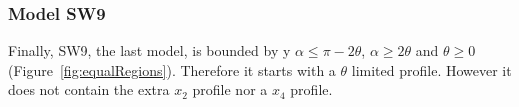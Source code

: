 \subsubsection{Model SW9} \label{SW9}

Finally, SW9, the last model, is bounded by y $\alpha \le \pi - 2\theta$, $\alpha \ge 2\theta$ and $\theta \ge 0$ (Figure~\ref{fig:equalRegions}).
Therefore it starts with a $\theta$ limited profile.
However it does not contain the extra $x_2$ profile nor a $x_4$ profile.








